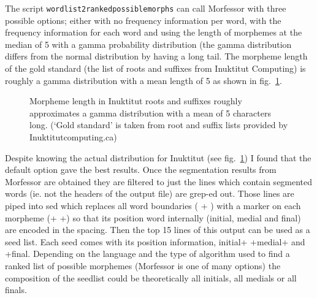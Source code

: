 \documentclass[runningheads,a4paper]{llncs}
\begin{document}
The script {\tt wordlist2rankedpossiblemorphs} can call Morfessor with three possible options; either with no frequency information per word, with the frequency information for each word and using the length of morphemes at the median of 5 with a gamma probability distribution (the gamma distribution differs from the normal distribution by having a long tail. The morpheme length of the gold standard (the list of roots and suffixes from Inuktitut Computing) is roughly a gamma distribution with a mean length of 5 as shown in fig.~\ref{fig:morphlength}. 


\begin{figure}[htb]
	\caption{Morpheme length in Inuktitut roots and suffixes roughly approximates a gamma distribution with a mean of 5 characters long. (`Gold standard' is taken from root and suffix lists provided by Inuktitutcomputing.ca)}
	\label{fig:morphlength}
\end{figure}

Despite knowing the actual distribution for Inuktitut (see fig.~\ref{fig:morphlength}) I found that the default option gave the best results. Once the segmentation results from Morfessor are obtained they are filtered to just the lines which contain  segmented words (ie. not the headers of the output file) are grep-ed out. Those lines are piped into sed which replaces all word boundaries ( + ) with a marker on each morpheme (+ +) so that its position word internally (initial, medial and final) are encoded in the spacing. Then the top 15 lines of this output can be used as a seed list. Each seed comes with its position information, initial+ +medial+ and +final. Depending on the language and the type of algorithm used to find a ranked list of possible morphemes (Morfessor is one of many options) the composition of the seedlist could be theoretically all initials, all medials or all finals.
\end{document}
